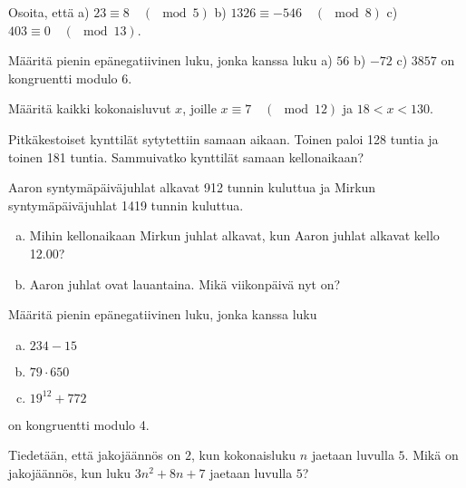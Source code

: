 \begin{tehtavasivu}

\begin{tehtava}
	Osoita, että a) $23 \equiv 8 \quad (\mod 5)$ b) $1326 \equiv -546\quad (\mod 8)$ c) $403 \equiv 0 \quad (\mod 13)$.
\end{tehtava}

\begin{tehtava}
	Määritä pienin epänegatiivinen luku, jonka kanssa luku a) $56$ b) $-72$ c) $3857$ on kongruentti modulo $6$.
\end{tehtava}

\begin{tehtava}
	Määritä kaikki kokonaisluvut $x$, joille $x \equiv 7 \quad (\mod 12)$ ja $18 < x < 130$.
\end{tehtava}

\begin{tehtava}
	Pitkäkestoiset kynttilät sytytettiin samaan aikaan. Toinen paloi 128 tuntia ja toinen 181 tuntia. Sammuivatko kynttilät samaan kellonaikaan?
\end{tehtava}

\begin{tehtava}
	Aaron syntymäpäiväjuhlat alkavat 912 tunnin kuluttua ja Mirkun syntymäpäiväjuhlat 1419 tunnin kuluttua.
	\begin{enumerate}[a)]
	\item Mihin kellonaikaan Mirkun juhlat alkavat, kun Aaron juhlat alkavat kello 12.00?
	\item Aaron juhlat ovat lauantaina. Mikä viikonpäivä nyt on?
	\end{enumerate}
\end{tehtava}

\begin{tehtava}
	Määritä pienin epänegatiivinen luku, jonka kanssa luku
	\begin{enumerate}[a)]
	\item $234 - 15$
	\item $79 \cdot 650$
	\item $19^{12} + 772$
	\end{enumerate}
	on kongruentti modulo 4.
\end{tehtava}

\begin{tehtava}
	Tiedetään, että jakojäännös on $2$, kun kokonaisluku $n$ jaetaan luvulla $5$. Mikä on jakojäännös, kun luku $3n^2 + 8n + 7$ jaetaan luvulla $5$?
\end{tehtava}


\end{tehtavasivu}
